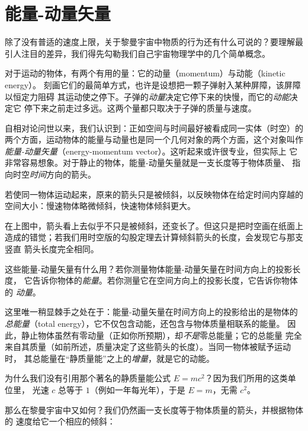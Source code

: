 \section{能量-动量矢量}

除了没有普适的速度上限，关于黎曼宇宙中物质的行为还有什么可说的？要理解最
引人注目的差异，我们得先勾勒我们自己宇宙物理学中的几个简单概念。

对于运动的物体，有两个有用的量：它的动量（momentum）与动能（kinetic energy）。
刻画它们的最简单方式，也许是设想把一颗子弹射入某种屏障，该屏障以恒定力阻碍
其运动使之停下。子弹的\emph{动量}决定它停下来的快慢，而它的\emph{动能}决定它
停下来之前走过多远。这两个量都只取决于子弹的质量与速度。

自相对论问世以来，我们认识到：正如空间与时间最好被看成同一实体（时空）的
两个方面，运动物体的能量与动量也是同一个几何对象的两个方面，这个对象叫作
\emph{能量-动量矢量}（energy-momentum vector）。这听起来或许很专业，但实际上
它非常容易想象。对于静止的物体，能量-动量矢量就是一支长度等于物体质量、
指向时空\emph{时间}方向的箭头。


若使同一物体运动起来，原来的箭头只是被倾斜，以反映物体在给定时间内穿越的
空间大小：慢速物体略微倾斜，快速物体倾斜更大。

在上图中，箭头看上去似乎不只是被倾斜，还变长了。但这只是把时空画在纸面上
造成的错觉；若我们用时空版的勾股定理去计算倾斜箭头的长度，会发现它与那支竖直
箭头长度完全相同。

这些能量-动量矢量有什么用？若你测量物体能量-动量矢量在时间方向上的投影长度，
它告诉你物体的\emph{能量}。若你测量它在空间方向上的投影长度，它告诉你物体的
\emph{动量}。


这里唯一稍显棘手之处在于：能量-动量矢量在时间方向上的投影给出的是物体的
\emph{总能量}（total energy），它不仅包含动能，还包含与物体质量相联系的能量。
因此，静止物体虽然有零动量（正如你所预期），却\emph{不是}零总能量；它的总能量
完全来自其质量（如前所述，质量决定了这些箭头的长度）。当同一物体被赋予运动时，
其总能量在“静质量能”之上的\emph{增量}，就是它的动能。

为什么我们没有引用那个著名的静质量能公式 $E=mc^2$？因为我们所用的这类单位里，
光速 $c$ 总等于 $1$（例如一年每光年），于是 $E=m$，无需 $c^2$。

那么在黎曼宇宙中又如何？我们仍然画一支长度等于物体质量的箭头，并根据物体的
速度给它一个相应的倾斜：


